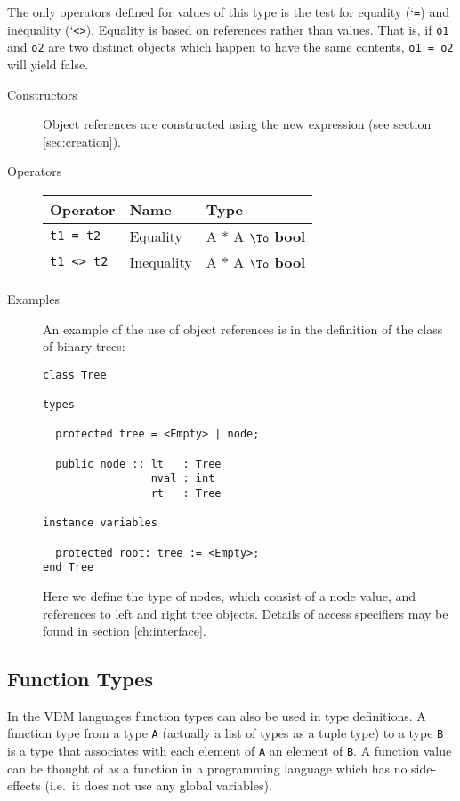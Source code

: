 \documentclass{overturerepchap}
\newcommand{\Lit}[1]{`{\tt #1}\Quote}
\newcommand{\keyw}[1]{{\bf\ttfamily #1}}
\newcommand{\PROD}[2]{#1 * #2}
\newcommand{\TO}[2]{#1 $\To$ #2}
\begin{document}
The only operators defined for values of this type is the test for
equality (\Lit{=}) and inequality (\Lit{<>}). Equality is based on references rather than
values. That is, if \texttt{o1} and \texttt{o2} are two distinct
objects which happen to have the same contents, \texttt{o1 = o2} will
yield false.

\begin{description}
\item[Constructors] Object references are constructed using the new
expression (see section \ref{sec:creation}).

\item[Operators]\mbox{}

  \begin{tabular}{|l|l|l|}\hline
    Operator & Name & Type \\ \hline
    {\tt t1 = t2} & Equality & \TO{\PROD{A}{A}}{\keyw{bool}} \\
    {\tt t1 <> t2} & Inequality & \TO{\PROD{A}{A}}{\keyw{bool}} \\
    \hline
  \end{tabular}

\item[Examples]
An example of the use of object references is in the definition of the
class of binary trees:
\begin{lstlisting}
class Tree

types

  protected tree = <Empty> | node;
    
  public node :: lt   : Tree
                 nval : int
                 rt   : Tree

instance variables

  protected root: tree := <Empty>;
end Tree
\end{lstlisting}
\label{TreeDef}

Here we define the type of nodes, which consist of a node value, and
references to left and right tree objects.
Details of access specifiers may be found in section
\ref{ch:interface}.
\end{description}

\subsection{Function Types}

In the VDM languages function types can also be used in type
definitions.  A function type from a type {\tt A} (actually a list of
types as a tuple type) to a type {\tt B} is a type that associates with each element
of {\tt A} an element of {\tt B}. A function value can be thought of
as a function in a programming language which has no side-effects
(i.e.\ it does not use any global variables).
\end{document}
